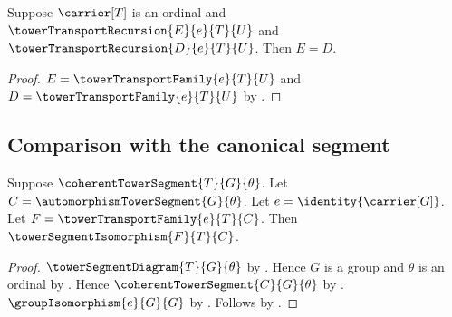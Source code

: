\begin{corollary}\label{tower_transport_recursive_families_equal}
    Suppose $\carrier[T]$ is an ordinal and
        $\towerTransportRecursion{E}{e}{T}{U}$ and
        $\towerTransportRecursion{D}{e}{T}{U}$.
    Then $E=D$.
\end{corollary}
\begin{proof}
    $E=\towerTransportFamily{e}{T}{U}$ and
        $D=\towerTransportFamily{e}{T}{U}$ by
        .
\end{proof}

\subsection{Comparison with the canonical segment}

\begin{theorem}\label{coherent_tower_segment_isomorphic_to_canonical}
    Suppose $\coherentTowerSegment{T}{G}{\theta}$.
    Let $C=\automorphismTowerSegment{G}{\theta}$.
    Let $e=\identity{\carrier[G]}$.
    Let $F=\towerTransportFamily{e}{T}{C}$.
    Then $\towerSegmentIsomorphism{F}{T}{C}$.
\end{theorem}
\begin{proof}
    $\towerSegmentDiagram{T}{G}{\theta}$ by
        .
    Hence $G$ is a group and $\theta$ is an ordinal by
        .
    Hence $\coherentTowerSegment{C}{G}{\theta}$ by
        .
    $\groupIsomorphism{e}{G}{G}$ by
        .
    Follows by .
\end{proof}
